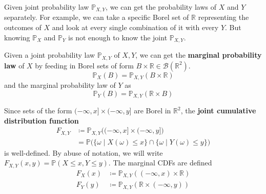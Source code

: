   Given joint probability law $\mathbb{P}_{X, Y}$, we can get the probability laws of $X$ and $Y$ separately. For example, we can take a specific Borel set of $\mathbb{R}$ representing the outcomes of $X$ and look at every single combination of it with every $Y$. But knowing $\mathbb{P}_X$ and $\mathbb{P}_Y$ is not enough to know the joint $\mathbb{P}_{X, Y}$. 

  \begin{definition}
    Given a joint probability law $\mathbb{P}_{X, Y}$ of $X, Y$, we can get the \textbf{marginal probability law} of $X$ by feeding in Borel sets of form $B \times \mathbb{R} \in \mathcal{B}(\mathbb{R}^2)$. 
    \begin{equation}
      \mathbb{P}_X (B) = \mathbb{P}_{X, Y} (B \times \mathbb{R})
    \end{equation}
    and the marginal probability law of $Y$ as 
    \begin{equation}
      \mathbb{P}_Y (B) = \mathbb{P}_{X, Y} (\mathbb{R} \times B)
    \end{equation}
  \end{definition}

  \begin{definition}
    Since sets of the form $(-\infty, x] \times (-\infty, y]$ are Borel in $\mathbb{R}^2$, the \textbf{joint cumulative distribution function} 
    \begin{align*}
      F_{X, Y} & \coloneqq \mathbb{P}_{X, Y} \big( (-\infty, x] \times (-\infty, y] \big) \\
      & = \mathbb{P} \big( \{\omega \mid X(\omega) \leq x\} \cap \{ \omega \mid Y(\omega) \leq y\} \big)
    \end{align*}
    is well-defined. By abuse of notation, we will write $F_{X, Y} (x, y) = \mathbb{P}(X \leq x, Y \leq y)$. The marginal CDFs are defined 
    \begin{align*}
      F_X (x) & \coloneqq \mathbb{P}_{X, Y} ((-\infty, x) \times \mathbb{R}) \\
      F_Y (y) & \coloneqq \mathbb{P}_{X, Y} (\mathbb{R} \times (-\infty, y))
    \end{align*}
  \end{definition}


